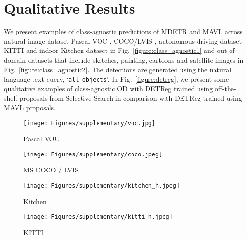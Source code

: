 \documentclass[runningheads]{llncs}
\newcommand{\txt}[1]{{\texttt{#1}}}
\begin{document}
\section{Qualitative Results}\label{app:qual_results}
We present examples of class-agnostic predictions of MDETR and MAVL across natural image dataset Pascal VOC \cite{voc}, COCO/LVIS \cite{coco,gupta2019lvis}, autonomous driving dataset KITTI \cite{kitti} and indoor Kitchen dataset \cite{kitchen} in Fig.~\ref{figure:class_agnostic1} and out-of-domain datasets that include sketches, painting, cartoons \cite{clipart-comic-water} and satellite images \cite{dota} in Fig.~\ref{figure:class_agnostic2}. The detections are generated using the natural language text query, ‘\txt{all objects}'. In Fig.~\ref{figure:detreg}, we present some qualitative examples of class-agnostic OD with DETReg \cite{detreg} trained using off-the-shelf proposals from Selective Search \cite{uijlings2013selective} in comparison with DETReg trained using MAVL proposals.
\begin{figure*}[!ht]
  \centering
  \begin{subfigure}{.5\columnwidth}
    \centering
    \texttt{[image: Figures/supplementary/voc.jpg]}
    \caption{Pascal VOC \cite{voc}}
    \label{a}
  \end{subfigure}\begin{subfigure}{.5\columnwidth}
    \centering
    \texttt{[image: Figures/supplementary/coco.jpeg]}
    \caption{MS COCO \cite{coco} / LVIS \cite{gupta2019lvis}}
    \label{b}
  \end{subfigure}\hfill
  \begin{subfigure}{\columnwidth}
    \centering
    \texttt{[image: Figures/supplementary/kitchen\_h.jpeg]}
    \caption{Kitchen \cite{kitchen}}
    \label{g}
  \end{subfigure}\hfill
  \begin{subfigure}{\columnwidth}
    \centering
    \texttt{[image: Figures/supplementary/kitti\_h.jpeg]}
    \caption{KITTI \cite{kitti}}
    \label{h}
  \end{subfigure}
  \caption{Class-agnostic detections of MViTs (MDETR \cite{mdetr} and MAVL) on natural image datasets, Pascal VOC, MS COCO/LVIS, Kitchen and KITTI.}
  \label{figure:class_agnostic1}
\end{figure*}
\end{document}
